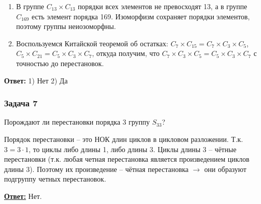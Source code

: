 \documentclass[a4paper,14pt]{article} %
\begin{document}
\begin{enumerate}
	\item В группе $C_{13} \times C_{13}$ порядки всех элементов не превосходят 13, а в группе $C_{169}$ есть элемент порядка 169. Изоморфизм сохраняет порядки элементов, поэтому группы неиозоморфны.
	\item Воспользуемся Китайской теоремой об остатках: $C_7 \times C_{15} = C_7 \times C_3 \times C_5$, $C_5 \times C_{21} = C_5 \times C_3 \times C_7$, откуда получим, что $C_7 \times C_3 \times C_5 = C_5 \times C_3 \times C_7$ с точностью до перестановок.
\end{enumerate}

{\textbf{Ответ:}} 1) Нет 2) Да

\subsubsection{Задача 7}
Порождают ли перестановки порядка 3 группу $S_{33}$?

Порядок перестановки -- это НОК длин циклов в цикловом разложении. Т.к. $3 = 3 \cdot 1$, то циклы либо длины 1, либо длины 3. Циклы длины 3 -- чётные перестановки (т.к. любая четная перестановка является произведением циклов длины 3). Поэтому их произведение -- чётная перестановка $\rightarrow$ они образуют подгруппу четных перестановок.

\underline{\textbf{Ответ:}} Нет.
\end{document}
